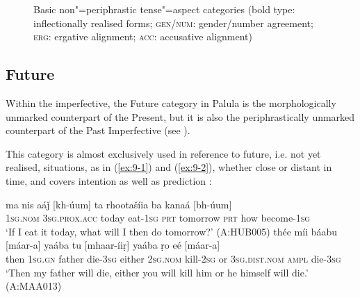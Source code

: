 \begin{figure}[ht]
\centering
{}
\caption{Basic non"=periphrastic tense"=aspect categories (bold type: inflectionally realised forms;
    \textsc{gen/num}: gender/number agreement; \textsc{erg}: ergative alignment; \textsc{acc}:
    accusative alignment)}
\label{fig:9-1}
\end{figure}

\subsection{Future}
\label{subsec:9-1-2}


Within the imperfective, the Future category in Palula is the morphologically unmarked counterpart of the Present, but it is also the periphrastically unmarked counterpart of the Past Imperfective (see ). 



This category is almost exclusively used in reference to future, i.e. not yet realised, situations, as in (\ref{ex:9-1}) and (\ref{ex:9-2}), whether close or distant in time, and covers intention as well as prediction \citep[105--108]{dahl1985}:

\begin{exe}
\ex
\label{ex:9-1}
\gll ma nis aáǰ [kh-úum] ta rhootašíia ba kanaá [bh-úum]  \\
\textsc{1sg.nom} \textsc{3}\textsc{sg.prox.acc} today eat-\textsc{1sg} \textsc{prt} tomorrow  \textsc{prt} how become-\textsc{1sg} \\
\glt `If I eat it today, what will I then do tomorrow?' (A:HUB005)
\ex
\label{ex:9-2}
\gll thée míi báabu [máar-a] yaába tu [mhaar-íiṛ] yaába ṛo eé [máar-a] \\
then \textsc{1sg.gn} father die-\textsc{3sg} either \textsc{2sg.nom} kill-\textsc{2sg}  or \textsc{3sg.dist.nom} \textsc{ampl} die-\textsc{3sg}  \\
\glt `Then my father will die, either you will kill him or he himself will die.' (A:MAA013)
\end{exe}

